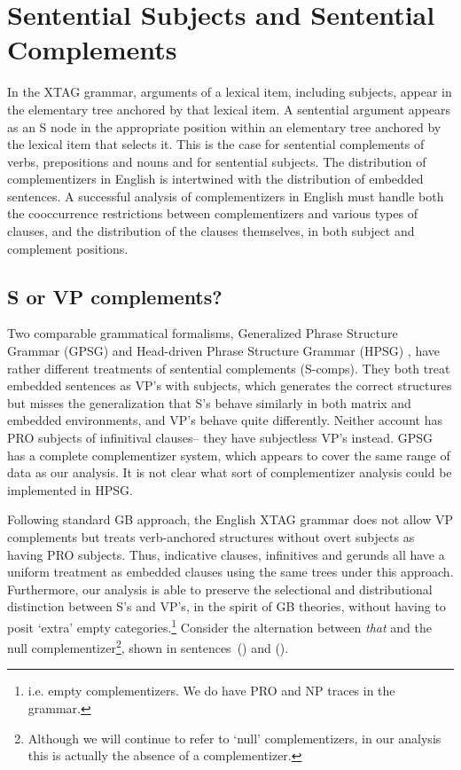 
\chapter{Sentential Subjects and Sentential Complements}
\label{scomps-section}

In the XTAG grammar, arguments of a lexical item, including
subjects, appear in the elementary tree anchored by that lexical item.  A
sentential argument appears as an S node in the appropriate position
within an elementary tree anchored by the lexical item that selects
it. This is the case for sentential complements of verbs, prepositions
and nouns and for sentential subjects. The distribution of
complementizers in English is intertwined with the distribution of
embedded sentences.  A successful analysis of complementizers in
English must handle both the cooccurrence restrictions between
complementizers and various types of clauses, and the distribution of
the clauses themselves, in both subject and complement positions.

\section{S or VP complements?}
 
Two comparable grammatical formalisms, Generalized Phrase Structure
Grammar (GPSG) \cite{gazdar85} and Head-driven Phrase Structure
Grammar (HPSG) \cite{PollardSag94:BK}, have rather different
treatments of sentential complements (S-comps).  They both treat
embedded sentences as VP's with subjects, which generates the correct
structures but misses the generalization that S's behave similarly in
both matrix and embedded environments, and VP's behave quite
differently.  Neither account has PRO\label{PRO} subjects of
infinitival clauses-- they have subjectless VP's instead.  GPSG has a
complete complementizer system, which appears to cover the same range
of data as our analysis.  It is not clear what sort of complementizer
analysis could be implemented in HPSG.

Following standard GB approach, the English XTAG grammar does not
allow VP complements but treats verb-anchored structures without overt
subjects as having PRO subjects. Thus, indicative clauses, infinitives
and gerunds all have a uniform treatment as embedded clauses using the
same trees under this approach. Furthermore, our analysis is able to
preserve the selectional and distributional distinction between S's and
VP's, in the spirit of GB theories, without having to posit `extra'
empty categories.\footnote{i.e. empty complementizers. We do have PRO
and NP traces in the grammar.} Consider the alternation between {\it
that} and the null complementizer\footnote{Although we will continue
to refer to `null' complementizers, in our analysis this is actually
the absence of a complementizer.}, shown in sentences~() and ().

